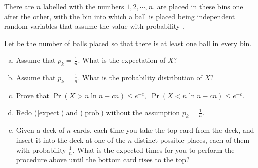 
\begin{frame}{}

  \pause
  \begin{columns}
  \end{columns}
\end{frame}

\begin{frame}{}
  \begin{exampleblock}{}
    There are $n$  labelled with the numbers $1, 2, \cdots, n$.
     are placed in these bins one after the other,
    with the bin into which a ball is placed being independent random variables
    that assume the value  with probability .

    Let  be the number of balls placed so that there is at least one ball in every bin.
    \begin{enumerate}[(a)]
      \setlength{\itemsep}{5pt}
      \item \label{expect}
	Assume that $p_k = \frac{1}{n}$. What is the expectation of $X$?
      \item \label{prob}
	Assume that $p_k = \frac{1}{n}$. What is the probability distribution of $X$?
      \item Prove that $\Pr(X > n \ln n + cn) \le e^{-c},\; \Pr(X < n \ln n - cn) \le e^{-c}.$
      \item Redo (\ref{expect}) and (\ref{prob}) without the assumption $p_k = \frac{1}{n}$.
      \item Given a deck of $n$ cards, each time you take the top card from the deck,
	and insert it into the deck at one of the $n$ distinct possible places,
	each of them with probability $\frac{1}{n}$.
	What is the expected times for you to perform the procedure above until
	the bottom card rises to the top?
    \end{enumerate}
  \end{exampleblock}
\end{frame}

\begin{frame}{}
  \centerline{}

\end{frame}

\begin{frame}{}
  \centerline{}

  \begin{columns}
  \end{columns}
\end{frame}
